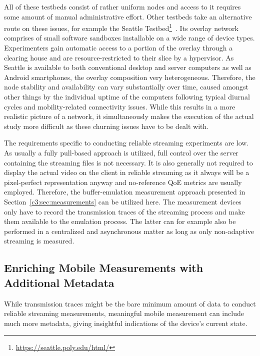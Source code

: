 All of these testbeds consist of rather uniform nodes and access to it requires some amount of manual administrative effort. Other testbeds take an alternative route on these issues, for example the Seattle Testbed\footnote{\url{https://seattle.poly.edu/html/}}~\cite{Cappos:2009:SPE:1508865.1508905}. Its overlay network comprises of small software sandboxes installable on a wide range of device types. Experimenters gain automatic access to a portion of the overlay through a clearing house and are resource-restricted to their slice by a hypervisor. As Seattle is available to both conventional desktop and server computers as well as Android smartphones, the overlay composition very heterogeneous. Therefore, the node stability and availability can vary substantially over time, caused amongst other things by the individual uptime of the computers following typical diurnal cycles and mobility-related connectivity issues. While this results in a more realistic picture of a network, it simultaneously makes the execution of the actual study more difficult as these churning issues have to be dealt with.

The requirements specific to conducting reliable streaming experiments are low. As usually a fully pull-based approach is utilized, full control over the server containing the streaming files is not necessary. It is also generally not required to display the actual video on the client in reliable streaming as it always will be a pixel-perfect representation anyway and no-reference \gls{QoE} metrics are usually employed. Therefore, the buffer-emulation measurement approach presented in Section~\ref{c3:sec:measurements} can be utilized here. The measurement devices only have to record the transmission traces of the streaming process and make them available to the emulation process. The latter can for example also be performed in a centralized and asynchronous matter as long as only non-adaptive streaming is measured.


\subsection{Enriching Mobile Measurements with Additional Metadata}
\label{c6:sec:sensorium}

While transmission traces might be the bare minimum amount of data to conduct reliable streaming measurements, meaningful mobile measurement can include much more metadata, giving insightful indications of the device's current state.

